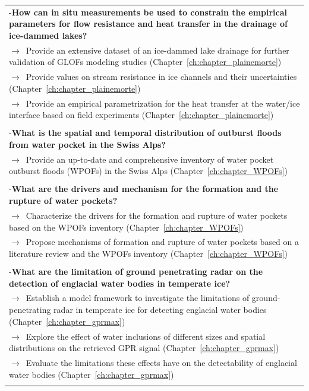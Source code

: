 \begin{longtable}{ |p{}| }
\hline
-\textbf{How can in situ measurements be used to constrain the empirical parameters for flow resistance and heat transfer in the drainage of ice-dammed lakes?}\\
$\rightarrow$\ Provide an extensive dataset of an ice-dammed lake drainage for further validation of GLOFs modeling studies (Chapter~\ref{ch:chapter_plainemorte})\\
$\rightarrow$\ Provide values on stream resistance in ice channels and their uncertainties (Chapter~\ref{ch:chapter_plainemorte}) \\
$\rightarrow$\ Provide an empirical parametrization for the heat transfer at the water/ice interface based on field experiments (Chapter~\ref{ch:chapter_plainemorte}) \\
\\

-\textbf{What is the spatial and temporal distribution of outburst floods from water pocket in the Swiss Alps?}\\
$\rightarrow$\ Provide an up-to-date and comprehensive inventory of water pocket outburst floods (WPOFs) in the Swiss Alps (Chapter~\ref{ch:chapter_WPOFs}) \\
\\

-\textbf{What are the drivers and mechanism for the formation and the rupture of water pockets?}\\
$\rightarrow$\ Characterize the drivers for the formation and rupture of water pockets based on the WPOFs inventory (Chapter~\ref{ch:chapter_WPOFs}) \\
$\rightarrow$\ Propose mechanisms of formation and rupture of water pockets based on a literature review and the WPOFs inventory (Chapter~\ref{ch:chapter_WPOFs}) \\
\\

-\textbf{What are the limitation of ground penetrating radar on the detection of englacial water bodies in temperate ice?}\\
$\rightarrow$\ Establish a model framework to investigate the limitations of ground-penetrating radar in temperate ice for detecting englacial water bodies (Chapter~\ref{ch:chapter_gprmax})\\
$\rightarrow$\ Explore the effect of water inclusions of different sizes and spatial distributions on the retrieved GPR signal (Chapter~\ref{ch:chapter_gprmax})\\
$\rightarrow$\ Evaluate the limitations these effects have on the detectability of englacial water bodies (Chapter~\ref{ch:chapter_gprmax})\\

\hline
\label{table_GLOFs_research_gaps}
\end{longtable}



